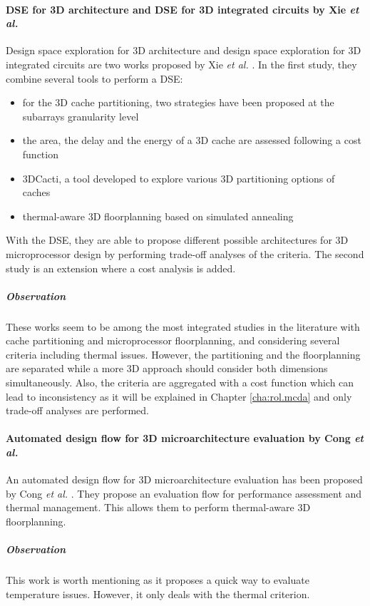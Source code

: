 \paragraph{DSE for 3D architecture and DSE for 3D integrated circuits by Xie \textit{et al.}}
Design space exploration for 3D architecture and design space exploration for 3D integrated circuits are two works proposed by Xie \textit{et al.} \cite{Xie:2006:DSE:1148015.1148016,4735042}. In the first study, they combine several tools to perform a DSE:
\begin{itemize}
\item for the 3D cache partitioning, two strategies have been proposed at the subarrays granularity level
\item the area, the delay and the energy of a 3D cache are assessed following a cost function
\item 3DCacti, a tool developed to explore various 3D partitioning options of caches
\item thermal-aware 3D floorplanning based on simulated annealing
\end{itemize}
With the DSE, they are able to propose different possible architectures for 3D microprocessor design by performing trade-off analyses of the criteria.
The second study is an extension where a cost analysis is added.
 
\subparagraph{Observation}
These works seem to be among the most integrated studies in the literature with cache partitioning and microprocessor floorplanning, and considering several criteria including thermal issues. However, the partitioning and the floorplanning are separated while a more 3D approach should consider both dimensions simultaneously. Also, the criteria are aggregated with a cost function which can lead to inconsistency as it will be explained in Chapter \ref{cha:rol.mcda} and only trade-off analyses are performed.

\paragraph{Automated design flow for 3D microarchitecture evaluation by Cong \textit{et al.}}
An automated design flow for 3D microarchitecture evaluation has been proposed by Cong \textit{et al.} \cite{1594713}. They propose an evaluation flow for performance assessment and thermal management. This allows them to perform thermal-aware 3D floorplanning.

\subparagraph{Observation}
This work is worth mentioning as it proposes a quick way to evaluate temperature issues. However, it only deals with the thermal criterion.

